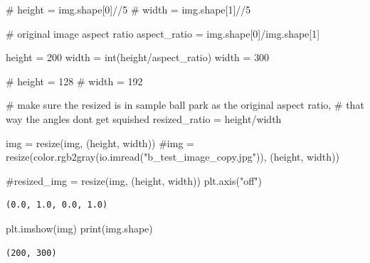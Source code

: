 \documentclass[
  letterpaper,
  DIV=11,
  numbers=noendperiod]{scrreprt}
\newenvironment{Shaded}{\begin{snugshade}}{\end{snugshade}}
\newcommand{\BuiltInTok}[1]{\textcolor[rgb]{0.00,0.23,0.31}{#1}}
\newcommand{\CommentTok}[1]{\textcolor[rgb]{0.37,0.37,0.37}{#1}}
\newcommand{\DecValTok}[1]{\textcolor[rgb]{0.68,0.00,0.00}{#1}}
\newcommand{\NormalTok}[1]{\textcolor[rgb]{0.00,0.23,0.31}{#1}}
\newcommand{\OperatorTok}[1]{\textcolor[rgb]{0.37,0.37,0.37}{#1}}
\newcommand{\StringTok}[1]{\textcolor[rgb]{0.13,0.47,0.30}{#1}}
\begin{document}
\begin{Shaded}
\begin{Highlighting}[]
\CommentTok{\# height = img.shape[0]//5}
\CommentTok{\# width = img.shape[1]//5}

\CommentTok{\# original image aspect ratio}
\NormalTok{aspect\_ratio }\OperatorTok{=}\NormalTok{ img.shape[}\DecValTok{0}\NormalTok{]}\OperatorTok{/}\NormalTok{img.shape[}\DecValTok{1}\NormalTok{]}

\NormalTok{height }\OperatorTok{=} \DecValTok{200}
\NormalTok{width }\OperatorTok{=} \BuiltInTok{int}\NormalTok{(height}\OperatorTok{/}\NormalTok{aspect\_ratio)}
\NormalTok{width }\OperatorTok{=} \DecValTok{300}

\CommentTok{\# height = 128}
\CommentTok{\# width = 192}

\CommentTok{\# make sure the resized is in sample ball park as the original aspect ratio, }
\CommentTok{\# that way the angles don\textquotesingle{}t get squished}
\NormalTok{resized\_ratio }\OperatorTok{=}\NormalTok{ height}\OperatorTok{/}\NormalTok{width}


\NormalTok{img }\OperatorTok{=}\NormalTok{ resize(img, (height, width))}
\CommentTok{\#img = resize(color.rgb2gray(io.imread("b\_test\_image\_copy.jpg")), (height, width))}


\CommentTok{\#resized\_img = resize(img, (height, width))}
\NormalTok{plt.axis(}\StringTok{"off"}\NormalTok{)}
\end{Highlighting}
\end{Shaded}

\begin{verbatim}
(0.0, 1.0, 0.0, 1.0)
\end{verbatim}

\begin{Shaded}
\begin{Highlighting}[]
\NormalTok{plt.imshow(img)}
\BuiltInTok{print}\NormalTok{(img.shape)}
\end{Highlighting}
\end{Shaded}

\begin{verbatim}
(200, 300)
\end{verbatim}
\end{document}
